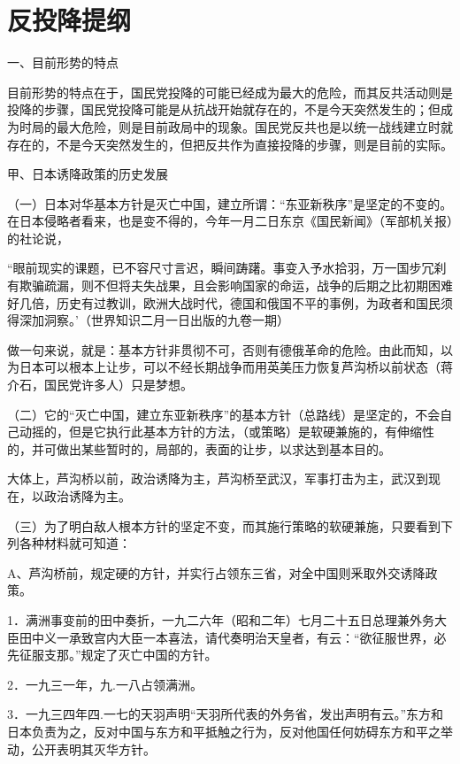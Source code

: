 \section[反投降提纲（一九三九年六月十日）]{反投降提纲}


一、目前形势的特点

目前形势的特点在于，国民党投降的可能已经成为最大的危险，而其反共活动则是投降的步骤，国民党投降可能是从抗战开始就存在的，不是今天突然发生的；但成为时局的最大危险，则是目前政局中的现象。国民党反共也是以统一战线建立时就存在的，不是今天突然发生的，但把反共作为直接投降的步骤，则是目前的实际。

甲、日本诱降政策的历史发展

（一）日本对华基本方针是灭亡中国，建立所谓：“东亚新秩序”是坚定的不变的。在日本侵略者看来，也是变不得的，今年一月二日东京《国民新闻》（军部机关报）的社论说，

“眼前现实的课题，已不容尺寸言迟，瞬间踌躇。事变入予水拾羽，万一国步冗刹有欺骗疏漏，则不但将夫失战果，且会影响国家的命运，战争的后期之比初期困难好几倍，历史有过教训，欧洲大战时代，德国和俄国不平的事例，为政者和国民须得深加洞察。’（世界知识二月一日出版的九卷一期）

做一句来说，就是：基本方针非贯彻不可，否则有德俄革命的危险。由此而知，以为日本可以根本上让步，可以不经长期战争而用英美压力恢复芦沟桥以前状态（蒋介石，国民党许多人）只是梦想。

（二）它的“灭亡中国，建立东亚新秩序”的基本方针（总路线）是坚定的，不会自己动摇的，但是它执行此基本方针的方法，（或策略）是软硬兼施的，有伸缩性的，并可做出某些暂时的，局部的，表面的让步，以求达到基本目的。

大体上，芦沟桥以前，政治诱降为主，芦沟桥至武汉，军事打击为主，武汉到现在，以政治诱降为主。

（三）为了明白敌人根本方针的坚定不变，而其施行策略的软硬兼施，只要看到下列各种材料就可知道：

A、芦沟桥前，规定硬的方针，并实行占领东三省，对全中国则釆取外交诱降政策。

1．满洲事变前的田中奏折，一九二六年（昭和二年）七月二十五日总理兼外务大臣田中义一承致宫内大臣一本喜法，请代奏明治天皇者，有云：“欲征服世界，必先征服支那。”规定了灭亡中国的方针。

2．一九三一年，九.一八占领满洲。

3．一九三四年四.一七的天羽声明“天羽所代表的外务省，发出声明有云。”东方和日本负责为之，反对中国与东方和平抵触之行为，反对他国任何妨碍东方和平之举动，公开表明其灭华方针。

